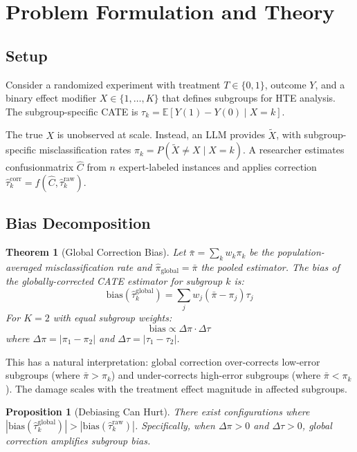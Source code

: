 \documentclass[11pt,a4paper]{article}
\newtheorem{theorem}{Theorem}
\newtheorem{proposition}{Proposition}
\newcommand{\bias}{\mathrm{bias}}
\begin{document}
\section{Problem Formulation and Theory}
\label{sec:theory}

\subsection{Setup}

Consider a randomized experiment with treatment $T \in \{0,1\}$, outcome $Y$, and a binary effect modifier $X \in \{1,\ldots,K\}$ that defines subgroups for HTE analysis. The subgroup-specific CATE is $\tau_k = \mathbb{E}[Y(1) - Y(0) \mid X = k]$.

The true $X$ is unobserved at scale. Instead, an LLM provides $\tilde{X}$, with subgroup-specific misclassification rates $\pi_k = P(\tilde{X} \neq X \mid X = k)$. A researcher estimates confusionmatrix $\hat{C}$ from $n$ expert-labeled instances and applies correction $\hat{\tau}_k^{\mathrm{corr}} = f(\hat{C}, \hat{\tau}_k^{\mathrm{raw}})$.

\subsection{Bias Decomposition}

\begin{theorem}[Global Correction Bias]
\label{thm:bias}
Let $\bar{\pi} = \sum_k w_k \pi_k$ be the population-averaged misclassification rate and $\hat{\pi}_{\mathrm{global}} = \bar{\pi}$ the pooled estimator. The bias of the globally-corrected CATE estimator for subgroup $k$ is:
\begin{equation}
\bias(\hat{\tau}_k^{\mathrm{global}}) = \sum_{j} w_j (\bar{\pi} - \pi_j) \tau_j
\end{equation}
For $K=2$ with equal subgroup weights:
\begin{equation}
\bias \propto \Delta\pi \cdot \Delta\tau
\label{eq:product}
\end{equation}
where $\Delta\pi = |\pi_1 - \pi_2|$ and $\Delta\tau = |\tau_1 - \tau_2|$.
\end{theorem}

This has a natural interpretation: global correction over-corrects low-error subgroups (where $\bar{\pi} > \pi_k$) and under-corrects high-error subgroups (where $\bar{\pi} < \pi_k$). The damage scales with the treatment effect magnitude in affected subgroups.

\begin{proposition}[Debiasing Can Hurt]
\label{prop:hurt}
There exist configurations where $|\bias(\hat{\tau}_k^{\mathrm{global}})| > |\bias(\hat{\tau}_k^{\mathrm{raw}})|$. Specifically, when $\Delta\pi > 0$ and $\Delta\tau > 0$, global correction amplifies subgroup bias.
\end{proposition}
\end{document}
